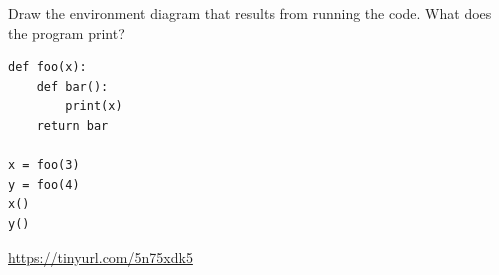 \begin{blocksection}
\question Draw the environment diagram that results from running the code. What does the program print?

\begin{lstlisting}
def foo(x):
    def bar():
        print(x)
    return bar

x = foo(3)
y = foo(4)
x()
y()
\end{lstlisting}

\begin{solution}[2in]
\url{https://tinyurl.com/5n75xdk5}
\end{solution}
\end{blocksection}
